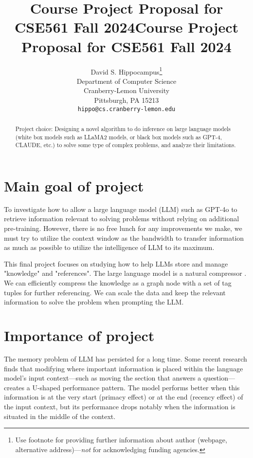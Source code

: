 \documentclass{article}
\title{Course Project Proposal for CSE561 Fall 2024}
\title{Course Project Proposal for CSE561 Fall 2024}
\author{%
  David S. Hippocampus\thanks{Use footnote for providing further information
    about author (webpage, alternative address)---\emph{not} for acknowledging
    funding agencies.} \\
  Department of Computer Science\\
  Cranberry-Lemon University\\
  Pittsburgh, PA 15213 \\
  \texttt{hippo@cs.cranberry-lemon.edu} \\
}
\begin{document}
\maketitle


\begin{abstract}

Project choice: Designing a novel algorithm to do inference on large language models (white box models such as LLaMA2 models, or black box models such as GPT-4, CLAUDE, etc.) to solve some type of complex problems, and analyze their limitations.

\end{abstract}


\section{Main goal of project}

To investigate how to allow a large language model (LLM) such as GPT-4o to retrieve information relevant to solving problems without relying on additional pre-training. However, there is no free lunch for any improvements we make, we must try to utilize the context window as the bandwidth to transfer information as much as possible to utilize the intelligence of LLM to its maximum.

This final project focuses on studying how to help LLMs store and manage "knowledge" and "references". The large language model is a natural compressor \cite{delétang2024languagemodelingcompression}. We can efficiently compress the knowledge as a graph node with a set of tag tuples for further referencing. We can scale the data and keep the relevant information to solve the problem when prompting the LLM.

\section{Importance of project}

The memory problem of LLM has persisted for a long time. Some recent research finds that modifying where important information is placed within the language model’s input context—such as moving the section that answers a question—creates a U-shaped performance pattern. The model performs better when this information is at the very start (primacy effect) or at the end (recency effect) of the input context, but its performance drops notably when the information is situated in the middle of the context. \cite{liu2023lostmiddlelanguagemodels}
\end{document}

